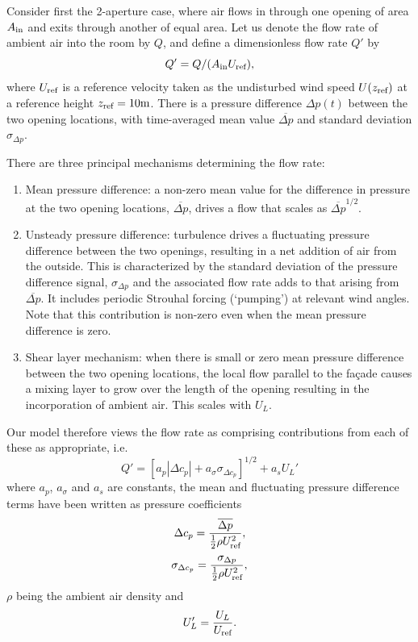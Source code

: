 Consider first the 2-aperture case, where air flows in through one opening of area
$A_\textup{in}$ and exits through another of equal area. Let us denote the flow rate
of ambient air into the room by $Q$, and define a dimensionless flow rate $Q'$ by
\begin{equation}
Q'=Q/(A_\textup{in} U_\textup{ref}),
\end{equation}
where $U_\textup{ref}$ is a reference velocity taken as the undisturbed wind speed
$U(z_\textup{ref})$ at a reference height $z_\textup{ref} = 10 \textup{m}$. There is a
pressure difference $\Delta p(t)$ between the two opening locations, with time-averaged
mean value $\overline{\Delta p}$ and standard deviation $\sigma_{\Delta p}$.

There are three principal mechanisms determining the flow rate:

\begin{enumerate}[label=(\alph*)]
\item Mean pressure difference:  a non-zero mean value for the difference in pressure
at the two opening locations, $\overline{\Delta p}$, drives a flow that scales as
$\overline{\Delta p}^{1/2}$.\label{ss-mean-mech}
\item Unsteady pressure difference: turbulence drives a fluctuating pressure difference
between the two openings, resulting in a net addition of air from the outside. This is
characterized by the standard deviation of the pressure difference signal,
$\sigma_{\Delta p}$ and the associated flow rate adds to that arising from
$\overline{\Delta p}$. It includes periodic Strouhal forcing (`pumping') at relevant
wind angles. Note that this contribution is non-zero even when the mean pressure
difference is zero.\label{ss-unsteady-mech}
\item Shear layer mechanism: when there is small or zero mean pressure difference
between the two opening locations, the local flow parallel to the fa\c{c}ade causes a
mixing layer to grow over the length of the opening resulting in the incorporation of
ambient air. This scales with $U_L$.\label{ss-shear-mech}
\end{enumerate}

Our model therefore views the flow rate as comprising contributions from each of these
as appropriate, i.e. 
\begin{equation}
Q'=\left[a_p |\Delta c_p |+a_\sigma \sigma_{\Delta c_p} \right]^{1/2}+a_s U_L'
\end{equation}
where $a_p$, $a_\sigma$ and $a_s$ are constants, the mean and fluctuating pressure
difference terms have been written as pressure coefficients
\begin{equation}
\Delta c_p=\frac{\overline{\Delta p}}{\frac{1}{2} \rho U_\textup{ref}^2},
\end{equation}
\begin{equation}
\sigma_{\Delta c_p}=\frac{\sigma_{\Delta p}}{\frac{1}{2} \rho U_\textup{ref}^2},
\end{equation}
$\rho$ being the ambient air density and
\begin{equation}
U_L'=\frac{U_L}{U_\textup{ref}}.
\end{equation}

